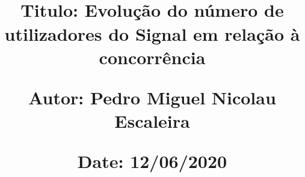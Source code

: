 \documentclass{article}
\begin{document}
\title{\vspace{-0.9cm}
       \large\raggedright\textbf{} \\ 
       \vspace{0.5cm}
       \normalsize
       \raggedright\textbf{Titulo: \hspace{1.1cm} Evolução do número de utilizadores do Signal em relação à concorrência} \\ \vspace{0.4cm}
       \raggedright\textbf{Autor: \hspace{1.13cm} Pedro Miguel Nicolau Escaleira} \\ \vspace{0.4cm}
       \raggedright\textbf{Date: \hspace{1.3cm} 12/06/2020} \\}
\author{}
\date{}

\maketitle
\thispagestyle{fancy}

\vspace{-1.4cm}

\tableofcontents

\newpage

\fontsize{10pt}{13pt}
\selectfont
\lsstyle




\end{document}
